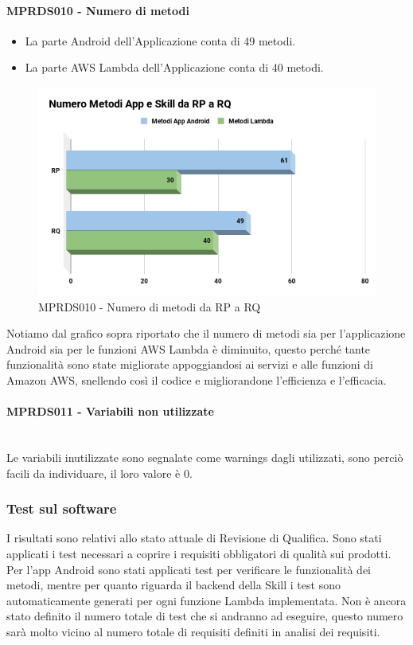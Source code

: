 \paragraph{MPRDS010 - Numero di metodi}
\begin{itemize}
	\item La parte Android dell'Applicazione conta di 49 metodi.
	\item La parte AWS Lambda dell'Applicazione conta di 40 metodi.
\end{itemize}
\begin{figure}[H]
	\centering
	\includegraphics[width=13cm,keepaspectratio]{../includes/pics/nMetodi.png}
	\caption{\label{fig:mission}MPRDS010 -  Numero di metodi da RP a RQ}
\end{figure}
Notiamo dal grafico sopra riportato che il numero di metodi sia per l'applicazione Android sia per le funzioni AWS Lambda è diminuito, questo perché tante funzionalità sono state migliorate appoggiandosi ai servizi e alle funzioni di Amazon AWS, snellendo così il codice e migliorandone l'efficienza e l'efficacia.
\paragraph{MPRDS011 - Variabili non utilizzate}\mbox{}\\[0.4cm]
Le variabili inutilizzate sono segnalate come warnings dagli  utilizzati, sono perciò facili da individuare, il loro valore è 0.
\subsubsection{Test sul software}
I risultati sono relativi allo stato attuale di Revisione di Qualifica. Sono stati applicati i test necessari a coprire i requisiti obbligatori di qualità sui prodotti. Per l'app Android sono stati applicati test per verificare le funzionalità dei metodi, mentre per quanto riguarda il backend della Skill i test sono automaticamente generati per ogni funzione Lambda implementata. Non è ancora stato definito il numero totale di test che si andranno ad eseguire, questo numero sarà molto vicino al numero totale di requisiti definiti in analisi dei requisiti.
